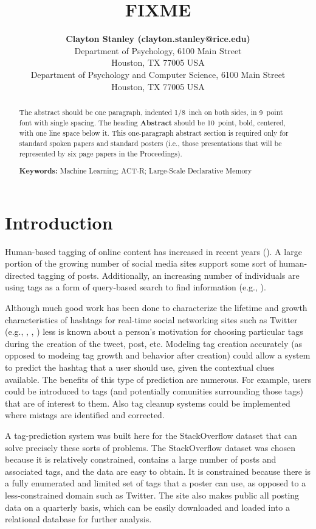 \documentclass[10pt,letterpaper]{article}
\title{FIXME}
\author{{\large \bf Clayton Stanley (clayton.stanley@rice.edu)} \\
  Department of Psychology, 6100 Main Street \\
  Houston, TX 77005 USA 
  \AND {\large \bf Mike Byrne (byrne@rice.edu)} \\
  Department of Psychology and Computer Science, 6100 Main Street \\
  Houston, TX 77005 USA }
\begin{document}
\maketitle

\begin{abstract}
The abstract should be one paragraph, indented 1/8~inch on both sides,
in 9~point font with single spacing. The heading {\bf Abstract} should
be 10~point, bold, centered, with one line space below it. This
one-paragraph abstract section is required only for standard spoken
papers and standard posters (i.e., those presentations that will be
represented by six page papers in the Proceedings).

\textbf{Keywords:} 
Machine Learning; ACT-R; Large-Scale Declarative Memory
\end{abstract}

\section{Introduction}

Human-based tagging of online content has increased in recent years (\cite{Chang2010}).
A large portion of the growing number of social media sites support some sort of human-directed tagging of posts.
Additionally, an increasing number of individuals are using tags as a form of query-based search to find information
(e.g., \cite{Diakopoulos2010}).

Although much good work has been done to characterize the lifetime and growth characteristics of hashtags for real-time social networking sites such as Twitter
(e.g., \cite{Bauer2012}, \cite{Tsur2012}, \cite{Chang2010})
less is known about a person's motivation for choosing particular tags during the creation of the tweet, post, etc.
Modeling tag creation accurately (as opposed to modeing tag growth and behavior after creation) could allow a system to predict the hashtag that a user should use, given the contextual clues available.
The benefits of this type of prediction are numerous.
For example, users could be introduced to tags (and potentially comunities surrounding those tags) that are of interest to them.
Also tag cleanup systems could be implemented where mistags are identified and corrected.

A tag-prediction system was built here for the StackOverflow dataset that can solve precisely these sorts of problems.
The StackOverflow dataset was chosen because it is relatively constrained, contains a large number of posts and associated tags, and the data are easy to obtain.
It is constrained because there is a fully enumerated and limited set of tags that a poster can use, as opposed to a less-constrained domain such as Twitter.
The site also makes public all posting data on a quarterly basis, which can be easily downloaded and loaded into a relational database for further analysis.
\end{document}
